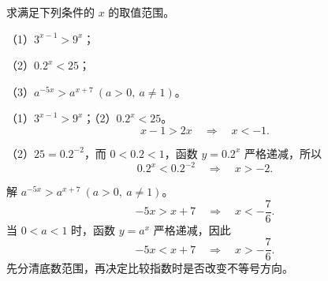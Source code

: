 \begin{frame}[t,label=A12q]
  求满足下列条件的 $x$ 的取值范围。
  \par\vspace{0.2cm}
  （1）$3^{x-1}>9^x$；
  \par\vspace{0.2cm}
  （2）$0.2^x<25$；
  \par\vspace{0.2cm}
  （3）$a^{-5x}>a^{x+7}\ (a>0,\ a\ne1)$。
  \pause
\end{frame}

\begin{frame}[t,label=A12a1]
  （1）$3^{x-1}>9^x$；\qquad（2）$0.2^x<25$。
  \pause
  \[
    x-1>2x\quad\Longrightarrow\quad x<-1.
  \]
  \par\vspace{0.3cm}
  （2）$25=0.2^{-2}$，而 $0<0.2<1$，函数 $y=0.2^x$ 严格递减，所以
  \[
    0.2^x<0.2^{-2}\quad\Longrightarrow\quad x>-2.
  \]
\end{frame}

\begin{frame}[t,label=A12a2]
  解 $a^{-5x}>a^{x+7}\ (a>0,\ a\ne1)$。
  \pause
  \[
    -5x>x+7\quad\Longrightarrow\quad x<-\frac76.
  \]
  当 $0<a<1$ 时，函数 $y=a^x$ 严格递减，因此
  \[
    -5x<x+7\quad\Longrightarrow\quad x>-\frac76.
  \]
  先分清底数范围，再决定比较指数时是否改变不等号方向。
\end{frame}

